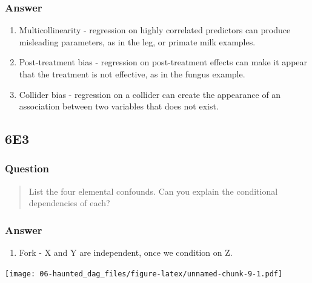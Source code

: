 \documentclass[
]{book}
\providecommand{\tightlist}{%
  \setlength{\itemsep}{0pt}\setlength{\parskip}{0pt}}
\begin{document}
\hypertarget{answer-49}{%
\subsubsection*{Answer}\label{answer-49}}

\begin{enumerate}
\def\labelenumi{\arabic{enumi}.}
\item
  Multicollinearity - regression on highly correlated predictors can produce misleading parameters, as in the leg, or primate milk examples.
\item
  Post-treatment bias - regression on post-treatment effects can make it appear that the treatment is not effective, as in the fungus example.
\item
  Collider bias - regression on a collider can create the appearance of an association between two variables that does not exist.
\end{enumerate}

\hypertarget{e3-4}{%
\subsection*{6E3}\label{e3-4}}

\hypertarget{question-50}{%
\subsubsection*{Question}\label{question-50}}

\begin{quote}
List the four elemental confounds. Can you explain the conditional dependencies of each?
\end{quote}

\hypertarget{answer-50}{%
\subsubsection*{Answer}\label{answer-50}}

\begin{enumerate}
\def\labelenumi{\arabic{enumi}.}
\tightlist
\item
  Fork - X and Y are independent, once we condition on Z.
\end{enumerate}

\texttt{[image: 06-haunted\_dag\_files/figure-latex/unnamed-chunk-9-1.pdf]}
\end{document}

